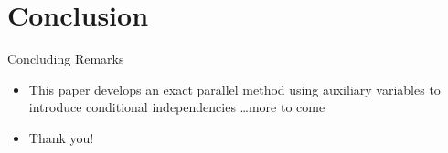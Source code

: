 \documentclass{beamer}
\begin{document}
  \section{Conclusion}

  \begin{frame}{Concluding Remarks}
    \begin{itemize}
      \item This paper develops an exact parallel method using auxiliary variables to introduce conditional independencies \ldots more to come
      \item Thank you!
    \end{itemize}
  \end{frame}
\end{document}
